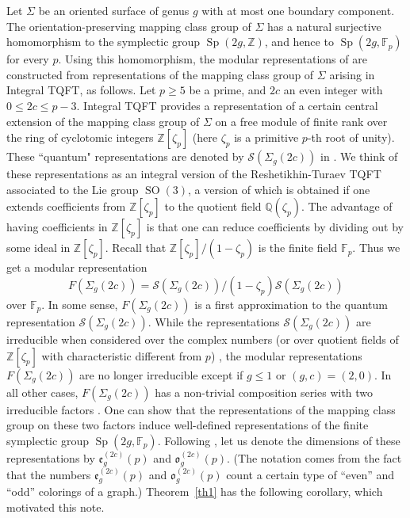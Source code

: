 \documentclass{amsart}
\begin{document}
 Let $\Sigma$ be an
oriented surface of genus $g$ with at most one boundary component. The
orientation-preserving mapping class group of ${{\Sigma}}$ has a natural
surjective homomorphism to the symplectic group $\operatorname{Sp}(2g,{{\mathbb{Z}}})$, and hence to
$\operatorname{Sp}(2g,{{\mathbb{F}}}_p)$ for every $p$. Using this homomorphism, the modular representations of \cite{GM4} are constructed from representations of the
mapping class group of $\Sigma$ arising in Integral TQFT, as follows.
Let $p\geq 5$ be 
a  
prime, and $2c$ an even
integer with $0\leq 2c\leq p-3$. Integral TQFT \cite{G,GM} provides a
representation of a certain central extension of the mapping class group of ${{\Sigma}}$ on a free
module of finite rank over the ring of cyclotomic integers
${{\mathbb{Z}}}[\zeta_p]$ (here $\zeta_p$ is a primitive $p$-th root of
unity). These ``quantum" representations are denoted by ${{\mathcal{S}}}({{\Sigma}}_g(2c))$ in
\cite{GM4}. We think of these representations as an integral version of the Reshetikhin-Turaev TQFT
associated to the Lie group $\operatorname{SO}(3)$, a version of which is obtained if one extends coefficients from ${{\mathbb{Z}}}[\zeta_p]$ to the quotient field
${{\mathbb{Q}}}(\zeta_p)$. The advantage of having coefficients in ${{\mathbb{Z}}}[\zeta_p]$
is that one can reduce coefficients by dividing out by some ideal in
${{\mathbb{Z}}}[\zeta_p]$. Recall that ${{\mathbb{Z}}}[\zeta_p]/(1-\zeta_p)$ is the finite field
${{\mathbb{F}}}_p$. Thus we get a modular representation 
$$F({{\Sigma}}_g(2c))={{\mathcal{S}}}({{\Sigma}}_g(2c))/(1-\zeta_p){{\mathcal{S}}}({{\Sigma}}_g(2c))$$ over
${{\mathbb{F}}}_p$. In some
sense, $F({{\Sigma}}_g(2c))$ is a first approximation to the quantum
representation ${{\mathcal{S}}}({{\Sigma}}_g(2c))$. 
While the representations ${{\mathcal{S}}}({{\Sigma}}_g(2c))$ are irreducible when
considered over the
complex numbers 
(or 
over  quotient fields of ${{\mathbb{Z}}}[\zeta_p]$ with characteristic different from $p$)
 \cite{Ro,GM4}, the modular representations
 $F({{\Sigma}}_g(2c))$ are no longer irreducible 
except if $g\leq 1$ or $(g,c)=(2,0)$.  
In all other cases, $F({{\Sigma}}_g(2c))$ has a 
non-trivial  
 composition series with 
two irreducible factors
 \cite{GM4}. 
One can show \cite{M} that the representations of the
 mapping class group on these two factors induce well-defined 
 representations of the finite
 symplectic group $\operatorname{Sp}(2g,{{\mathbb{F}}}_p)$. 
Following \cite{GM4}, let us denote the
 dimensions of these 
 representations  by ${\mathfrak{e}}_g^{(2c)}(p)$ and
 ${\mathfrak{o}}_g^{(2c)}(p)$. 
(The notation comes from the fact that the numbers ${\mathfrak{e}}_g^{(2c)}(p)$ and
 ${\mathfrak{o}}_g^{(2c)}(p)$ count a certain type of ``even'' and ``odd''
colorings of a graph.) 
Theorem~\ref{th1} has the
following corollary, which motivated this note. 
\end{document}
